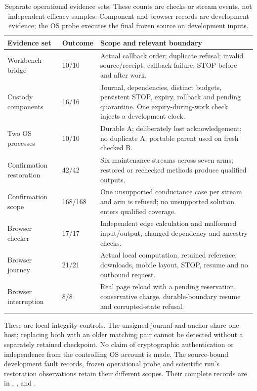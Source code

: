 \begin{table}[ht]\centering\small
\begin{tabularx}{\linewidth}{L{36mm}L{17mm}Y}
\toprule
Evidence set & Outcome & Scope and relevant boundary \\
\midrule
Workbench bridge & 10/10 & Actual callback order; duplicate refusal; invalid source/receipt; callback failure; STOP before and after work. \\
Custody components & 16/16 & Journal, dependencies, distinct budgets, persistent STOP, expiry, rollback and pending quarantine. One expiry-during-work check injects a development clock. \\
Two OS processes & 10/10 & Durable A; deliberately lost acknowledgement; no duplicate A; portable parent used on fresh checked B. \\
Confirmation restoration & 42/42 & Six maintenance streams across seven arms; restored or rechecked methods produce qualified outputs. \\
Confirmation scope & 168/168 & One unsupported conductance case per stream and arm is refused; no unsupported solution enters qualified coverage. \\
Browser checker & 17/17 & Independent edge calculation and malformed input/output, changed dependency and ancestry checks. \\
Browser journey & 21/21 & Actual local computation, retained reference, downloads, mobile layout, STOP, resume and no outbound request. \\
Browser interruption & 8/8 & Real page reload with a pending reservation, conservative charge, durable-boundary resume and corrupted-state refusal. \\
\bottomrule
\end{tabularx}
\caption{Separate operational evidence sets. These counts are checks or stream events, not independent efficacy samples. Component and browser records are development evidence; the OS probe executes the final frozen source on development inputs.}
\label{tab:operationchecks}
\end{table}

These are local integrity controls. The unsigned journal and anchor share one host; replacing both with an
older matching pair cannot be detected without a separately retained checkpoint. No claim of cryptographic
authentication or independence from the controlling OS account is made. The source-bound development fault
records, frozen operational probe and scientific run's restoration observations retain their different scopes.
Their complete records are in ,
, 
and .

